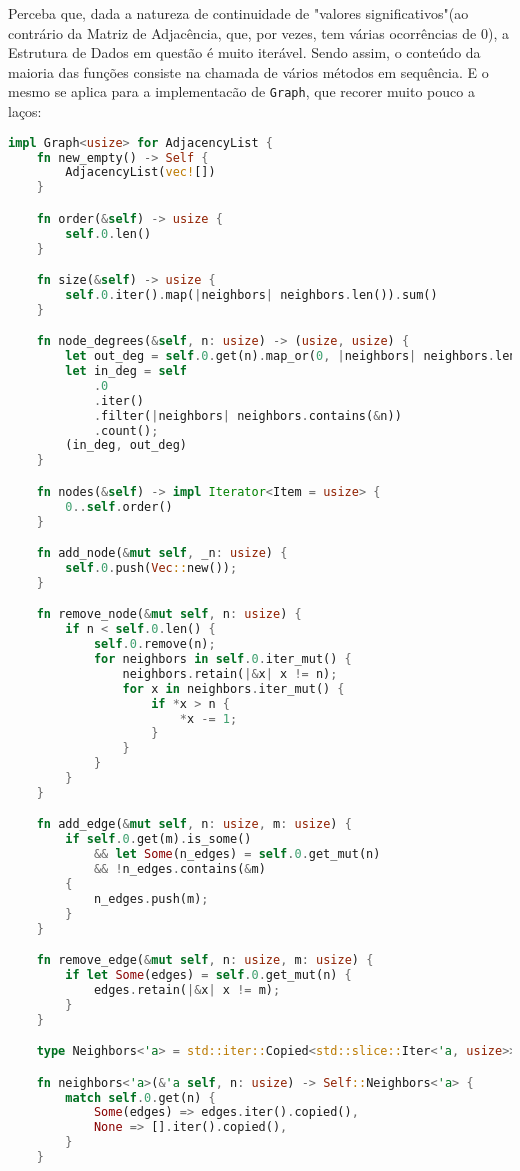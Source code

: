Perceba que, dada a natureza de continuidade de "valores significativos"(ao contrário da Matriz de Adjacência, que, por vezes, tem várias ocorrências de 0), a Estrutura de Dados em questão é muito iterável. Sendo assim, o conteúdo da maioria das funções consiste na chamada de vários métodos em sequência. E o mesmo se aplica para a implementacão de \texttt{Graph}, que recorer muito pouco a laços:

\begin{lstlisting}[language=Rust, caption={Implementação de Graph na Estrutura de Dados Matriz de Adjacência}, label=list:impl_adj_list_g]
impl Graph<usize> for AdjacencyList {
    fn new_empty() -> Self {
        AdjacencyList(vec![])
    }

    fn order(&self) -> usize {
        self.0.len()
    }

    fn size(&self) -> usize {
        self.0.iter().map(|neighbors| neighbors.len()).sum()
    }

    fn node_degrees(&self, n: usize) -> (usize, usize) {
        let out_deg = self.0.get(n).map_or(0, |neighbors| neighbors.len());
        let in_deg = self
            .0
            .iter()
            .filter(|neighbors| neighbors.contains(&n))
            .count();
        (in_deg, out_deg)
    }

    fn nodes(&self) -> impl Iterator<Item = usize> {
        0..self.order()
    }

    fn add_node(&mut self, _n: usize) {
        self.0.push(Vec::new());
    }

    fn remove_node(&mut self, n: usize) {
        if n < self.0.len() {
            self.0.remove(n);
            for neighbors in self.0.iter_mut() {
                neighbors.retain(|&x| x != n);
                for x in neighbors.iter_mut() {
                    if *x > n {
                        *x -= 1;
                    }
                }
            }
        }
    }

    fn add_edge(&mut self, n: usize, m: usize) {
        if self.0.get(m).is_some()
            && let Some(n_edges) = self.0.get_mut(n)
            && !n_edges.contains(&m)
        {
            n_edges.push(m);
        }
    }

    fn remove_edge(&mut self, n: usize, m: usize) {
        if let Some(edges) = self.0.get_mut(n) {
            edges.retain(|&x| x != m);
        }
    }

    type Neighbors<'a> = std::iter::Copied<std::slice::Iter<'a, usize>>;

    fn neighbors<'a>(&'a self, n: usize) -> Self::Neighbors<'a> {
        match self.0.get(n) {
            Some(edges) => edges.iter().copied(),
            None => [].iter().copied(),
        }
    }


\end{lstlisting}
